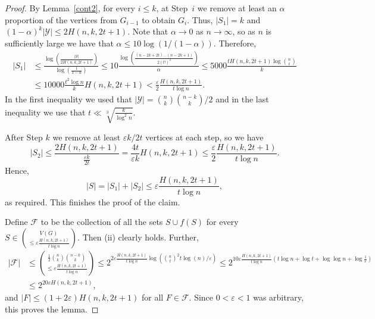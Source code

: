 \documentclass[11pt]{article}
\numberwithin{equation}{section}
\def\eps{\varepsilon}
\def\COMMENT#1{}
\begin{document}
\begin{proof}
By Lemma~\ref{cont2}, for every $i \leq k$, at Step~$i$ we remove at least an $\alpha$ proportion of the vertices from $G_{i-1}$ to obtain $G_i$.
Thus, $|S_1|=k$ and $(1-\alpha)^k |\mathcal Y|\leq 2H(n,k,2t+1)$. Note that \COMMENT{AT: I was originally worried that we needed  $k=o(n)$ for this... but think I was being stupid... can you just double check carefully please Adam} $\alpha \rightarrow 0$ as $n \rightarrow \infty$, so as $n$ is sufficiently large we have that $\alpha \leq 10 \log (1/(1-\alpha))$. 
Therefore,
\begin{equation*}
\begin{split}
|S_1| & \leq\frac{\log\left(\frac{|\mathcal{Y}|}{2H(n,k,2t+1)}\right)}{\log\left(\frac{1}{1-\alpha}\right)}\leq 10\frac{\log\left(\frac{(n-2k+2t)\ldots(n-2k+1)}{2(t!)^2}\right)}{\alpha}\leq 5000\frac{tH(n,k,2t+1)\log\binom{n}{t}}{k}\\
&\leq 10000\frac{t^2\log n}{k}H(n,k,2t+1)<\frac{\eps}{2}\frac{H(n,k,2t+1)}{t\log n}.
\end{split}
\end{equation*}
In the first inequality we used that $|\mathcal Y|=\binom{n}{k}\binom{n-k}{k}/2$ and
in the last inequality we use that $t\ll \sqrt[3]{\frac{ k}{\log^2 n}}$.

After Step $k$ we remove at least 
${\eps k}/{2t}$ vertices at each step, so we have 
$$|S_2|\leq \frac{2H(n,k,2t+1)}{\frac{\eps k}{2t}}=\frac{4t}{\eps k}H(n,k,2t+1)\leq \frac{\eps}{2} \frac{H(n,k,2t+1)}{t\log n}.$$
Hence,  $$|S|=|S_1|+|S_2|\leq \eps\frac{H(n,k,2t+1)}{t\log n},$$ as required. This finishes the proof of the claim.

\medskip

Define $\mathcal F$ to be the collection of all the sets $S \cup f(S)$ for every $S \in \binom{V(G)}{\leq \eps\frac{H(n,k,2t+1)}{t\log n}} $. Then (ii) clearly holds. Further,
\begin{equation*}
\begin{split}
|\mathcal{F}| & \leq\binom{\frac{1}{2}\binom{n}{k}\binom{n-k}{k}}{\leq\eps\frac{H(n,k,2t+1)}{t\log n}}\leq2^{2\eps\frac{H(n,k,2t+1)}{t\log n}\log \left(\binom{n}{t}^2t\log (n)/\eps\right)}\leq2^{10\eps\frac{H(n,k,2t+1)}{t\log n}(t\log n + \log t + \log \log n + \log\frac{1}{\eps})}\\
&\leq 2^{20\eps H(n,k,2t+1)},
\end{split}
\end{equation*}
and $|F| \leq (1+2 \eps )H (n,k,2t+1)$ for all $F \in \mathcal F$. Since $0<\eps <1$ was arbitrary, this proves the lemma.
\end{proof}
\end{document}

